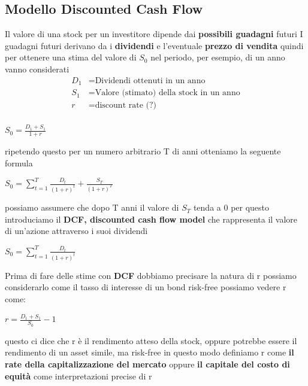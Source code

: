 \documentclass[a4paper,11pt]{report}
\begin{document}
{\subsection{Modello Discounted Cash Flow}
	Il valore di una stock per un investitore dipende dai \textbf{possibili guadagni} futuri \newline
	I guadagni futuri derivano da i \textbf{dividendi} e l'eventuale \textbf{prezzo di vendita} \newline
	quindi per ottenere una stima del valore di $S_0$ nel periodo, per esempio, di un anno vanno considerati
\begin{align*}
	\text{$D_1$} &= \text{Dividendi ottenuti in un anno}\\
	\text{$S_1$} &= \text{Valore (stimato) della stock in un anno}\\
	r &= \text{discount rate (?)}\\
\end{align*}
\begin{center}
	$S_0={\frac{D_1+S_1}{1+r}}$
\end{center}
	 ripetendo questo per un numero arbitrario T di anni otteniamo la seguente formula
\begin{center}
	$S_0 =\sum\limits_{t=1}^T {\frac {D_t}{(1+r)^t}}+{\frac {S_T}{(1+r)^T}}$
\end{center}	
	possiamo assumere che dopo T anni il valore di $S_T$ tenda a 0  \newline
	per questo introduciamo il \textbf{DCF, discounted cash flow model} che rappresenta il valore di un'azione attraverso i suoi 		dividendi
\begin{center}
	$S_0 =\sum\limits_{t=1}^T {\frac {D_t}{(1+r)^t}}$
\end{center}
	Prima di fare delle stime con \textbf{DCF} dobbiamo precisare la natura di r \newline
	possiamo considerarlo come il tasso di interesse di un bond risk-free \newline
	possiamo vedere r come:
\begin{center}
	$r={\frac {D_1 + S_1}{S_0}}-1$
\end{center}
	questo ci dice che r è il rendimento %
	atteso della stock, oppure potrebbe essere il rendimento di un asset simile, ma risk-free \newline
	in questo modo definiamo r come \textbf{il rate della capitalizzazione del mercato} oppure \textbf{il capitale del costo di 			equità} come interpretazioni precise di r

}
\end{document}
